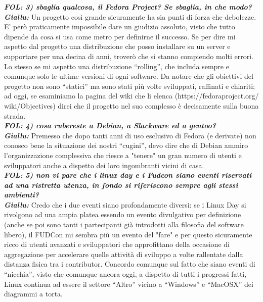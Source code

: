 \emph{\textbf{FOL: 3) sbaglia qualcosa, il Fedora Project? Se sbaglia, in che modo?}}\\
\emph{\textbf{Giallu: }}Un progetto così grande sicuramente ha sia punti di forza che debolezze. E' però praticamente impossibile dare un giudizio assoluto, visto che tutto dipende da cosa si usa come metro per definirne il successo. Se per dire mi aspetto dal progetto una distribuzione che posso installare su un server  e supportare per una decina di anni, troverò che si stanno compiendo molti errori. Lo stesso se mi aspetto una distribuzione ``rolling'', che includa sempre e comunque solo le ultime versioni di ogni software. 
Da notare che gli obiettivi del progetto non sono ``statici'' ma sono stati più volte sviluppati, raffinati e chiariti; ad oggi, se esaminiamo la pagina del wiki che li elenca (https://fedoraproject.org/\\wiki/Objectives) direi che il progetto nel suo complesso è decisamente sulla buona strada.\\

\emph{\textbf{FOL: 4) cosa rubereste a Debian, a Slackware ed a gentoo?}}\\
\emph{\textbf{Giallu: }}Premesso che dopo tanti anni di uso esclusivo di Fedora (e derivate) non conosco bene la situazione dei nostri ``cugini'', devo dire che di Debian ammiro l'organizzazione complessiva che riesce a "tenere" un gran numero di utenti e sviluppatori anche a dispetto dei loro ingombranti vicini di casa.\\

\emph{\textbf{FOL: 5) non vi pare che i linux day e i Fudcon siano eventi riservati ad una ristretta utenza, in fondo si riferiscono sempre agli stessi ambienti?}}\\
\emph{\textbf{Giallu: }}Credo che i due eventi siano profondamente diversi: se i Linux Day si rivolgono ad una ampia platea essendo un evento divulgativo per definizione (anche se poi sono tanti i partecipanti già introdotti alla filosofia del software libero), il FUDCon mi sembra più un evento del "fare" e per questo sicuramente ricco di utenti avanzati e sviluppatori che approfittano della occasione di aggregazione per accelerare quelle attività di sviluppo a volte rallentate dalla distanza fisica tra i contributor. Concordo comunque sul fatto che siano eventi di ``nicchia'', visto che comunque ancora oggi, a dispetto di tutti i progressi fatti, Linux continua ad essere il settore ``Altro'' vicino a ``Windows'' e ``MacOSX'' dei diagrammi a torta.\\

